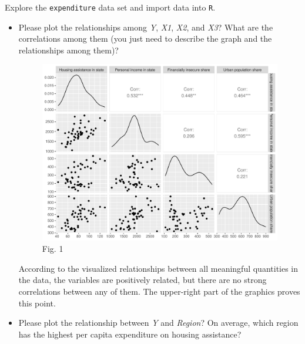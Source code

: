 \documentclass[12pt,letterpaper]{article}
\begin{document}
\vspace{.5cm}
\noindent Explore the \texttt{expenditure} data set and import data into \texttt{R}.
\vspace{.2cm}
  
\vspace{.2cm}
\begin{itemize}

\item
Please plot the relationships among \emph{Y}, \emph{X1}, \emph{X2}, and \emph{X3}? What are the correlations among them (you just need to describe the graph and the relationships among them)?
\vspace{.2cm}
  
\vspace{.2cm} 

\begin{figure}[h!]\centering
\vspace{.2cm}
\includegraphics[width=.75\textwidth]{Babaian-plot1.pdf}
\caption{Fig. 1}
\vspace{.2cm}
\end{figure}

According to the visualized relationships between all meaningful quantities in the data, the variables are positively related, but there are no strong correlations  between any of them. The upper-right part of the graphics proves this point.\\

\item
Please plot the relationship between \emph{Y} and \emph{Region}? On average, which region has the highest per capita expenditure on housing assistance?

\vspace{.2cm}
  
\vspace{.2cm} 


\end{itemize}
\end{document}
